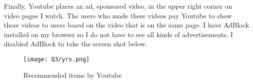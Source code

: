 \pagebreak

Finally, Youtube places an ad, sponsored video, in the upper right corner on  video pages I watch. The users who made these videos pay Youtube to show these videos to users based on the video that is on the same page. I have AdBlock installed on my browser so I do not have to see all kinds of advertisements. I disabled AdBlock to take the screen shot below.

\begin{figure}[h]
\caption{Recommended items by Youtube}
\centering
\texttt{[image: Q3/yrs.png]}
\end{figure}
 

 

